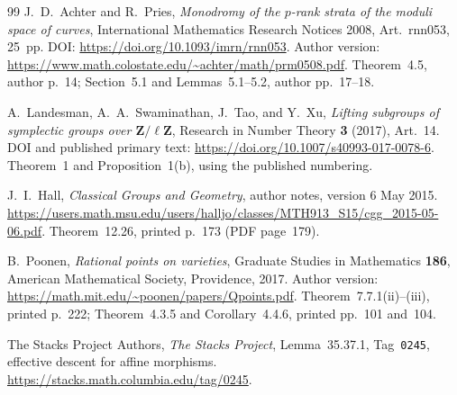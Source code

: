\begin{thebibliography}{99}
J.~D.~Achter and R.~Pries,
\emph{Monodromy of the $p$-rank strata of the moduli space of curves},
International Mathematics Research Notices 2008,
Art.~rnn053, 25~pp.
DOI: \url{https://doi.org/10.1093/imrn/rnn053}.
Author version:
\url{https://www.math.colostate.edu/~achter/math/prm0508.pdf}.
Theorem~4.5, author p.~14; Section~5.1 and Lemmas~5.1--5.2,
author pp.~17--18.

A.~Landesman, A.~A.~Swaminathan, J.~Tao, and Y.~Xu,
\emph{Lifting subgroups of symplectic groups over
$\mathbf Z/\ell\mathbf Z$},
Research in Number Theory \textbf{3} (2017), Art.~14.
DOI and published primary text:
\url{https://doi.org/10.1007/s40993-017-0078-6}.
Theorem~1 and Proposition~1(b), using the published numbering.

J.~I.~Hall, \emph{Classical Groups and Geometry},
author notes, version 6 May 2015.
\url{https://users.math.msu.edu/users/halljo/classes/MTH913_S15/cgg_2015-05-06.pdf}.
Theorem~12.26, printed p.~173 (PDF page~179).

B.~Poonen, \emph{Rational points on varieties},
Graduate Studies in Mathematics \textbf{186},
American Mathematical Society, Providence, 2017.
Author version: \url{https://math.mit.edu/~poonen/papers/Qpoints.pdf}.
Theorem~7.7.1(ii)--(iii), printed p.~222;
Theorem~4.3.5 and Corollary~4.4.6, printed pp.~101 and~104.

The Stacks Project Authors,
\emph{The Stacks Project}, Lemma~35.37.1,
Tag~\texttt{0245}, effective descent for affine morphisms.
\url{https://stacks.math.columbia.edu/tag/0245}.

\end{thebibliography}
